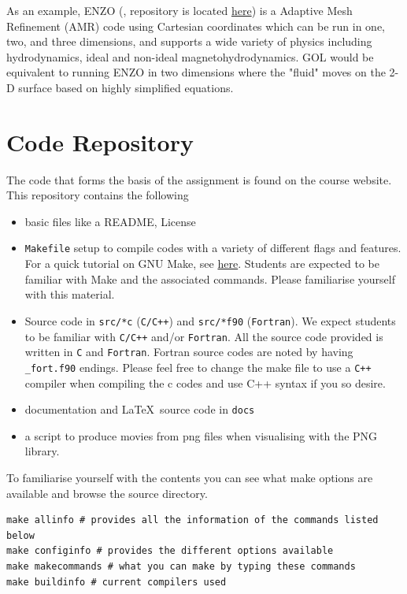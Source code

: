 \par 
As an example, ENZO (\cite{enzo}, repository is located \href{https://github.com/enzo-project/enzo-dev}{here}) is a Adaptive Mesh Refinement (AMR) code using Cartesian coordinates which can be run in one, two, and three dimensions, and supports a wide variety of physics including hydrodynamics, ideal and non-ideal magnetohydrodynamics. GOL would be equivalent to running ENZO in two dimensions where the "fluid" moves on the 2-D surface based on highly simplified equations. 

\section{Code Repository}\label{sec:code}
The code that forms the basis of the assignment is found on the course website. This repository contains the following 
\begin{itemize}
	\item basic files like a README, License
	\item \texttt{Makefile} setup to compile codes with a variety of different flags and features. For a quick tutorial on GNU Make, see \href{https://www.gnu.org/software/make/}{here}. Students are expected to be familiar with Make and the associated commands. Please familiarise yourself with this material. 
	\item Source code in \texttt{src/*c} (\texttt{C/C++}) and \texttt{src/*f90} (\texttt{Fortran}). We expect students to be familiar with \texttt{C/C++} and/or \texttt{Fortran}. All the source code provided is written in \texttt{C} and \texttt{Fortran}. Fortran source codes are noted by having \texttt{\_fort.f90} endings. Please feel free to change the make file to use a \texttt{C++} compiler when compiling the c codes and use C++ syntax if you so desire. 
	\item documentation and \LaTeX\ source code in \texttt{docs}
	\item a script to produce movies from png files when visualising with the PNG library. 
\end{itemize}
To familiarise yourself with the contents you can see what make options are available and browse the source directory. 
\begin{center}
\begin{minipage}{0.95\textwidth}
\small
\begin{verbatim}
make allinfo # provides all the information of the commands listed below  
make configinfo # provides the different options available 
make makecommands # what you can make by typing these commands
make buildinfo # current compilers used
\end{verbatim}
\end{minipage}
\end{center}
